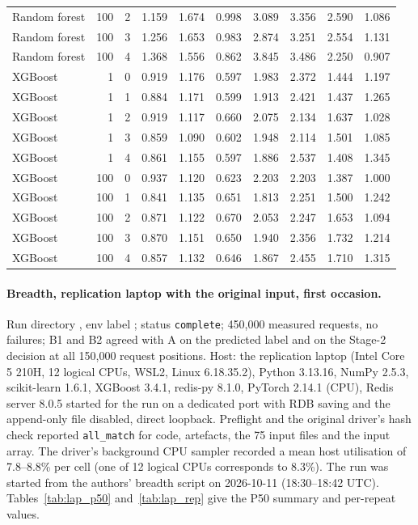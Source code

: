 \documentclass[10pt,a4paper]{article}
\begin{document}
\begin{longtable}{lrrrrrrrrr}
Random forest & 100 & 2 & 1.159 & 1.674 & 0.998 & 3.089 & 3.356 & 2.590 & 1.086 \\
Random forest & 100 & 3 & 1.256 & 1.653 & 0.983 & 2.874 & 3.251 & 2.554 & 1.131 \\
Random forest & 100 & 4 & 1.368 & 1.556 & 0.862 & 3.845 & 3.486 & 2.250 & 0.907 \\
XGBoost & 1 & 0 & 0.919 & 1.176 & 0.597 & 1.983 & 2.372 & 1.444 & 1.197 \\
XGBoost & 1 & 1 & 0.884 & 1.171 & 0.599 & 1.913 & 2.421 & 1.437 & 1.265 \\
XGBoost & 1 & 2 & 0.919 & 1.117 & 0.660 & 2.075 & 2.134 & 1.637 & 1.028 \\
XGBoost & 1 & 3 & 0.859 & 1.090 & 0.602 & 1.948 & 2.114 & 1.501 & 1.085 \\
XGBoost & 1 & 4 & 0.861 & 1.155 & 0.597 & 1.886 & 2.537 & 1.408 & 1.345 \\
XGBoost & 100 & 0 & 0.937 & 1.120 & 0.623 & 2.203 & 2.203 & 1.387 & 1.000 \\
XGBoost & 100 & 1 & 0.841 & 1.135 & 0.651 & 1.813 & 2.251 & 1.500 & 1.242 \\
XGBoost & 100 & 2 & 0.871 & 1.122 & 0.670 & 2.053 & 2.247 & 1.653 & 1.094 \\
XGBoost & 100 & 3 & 0.870 & 1.151 & 0.650 & 1.940 & 2.356 & 1.732 & 1.214 \\
XGBoost & 100 & 4 & 0.857 & 1.132 & 0.646 & 1.867 & 2.455 & 1.710 & 1.315 \\
\bottomrule
\end{longtable}

\paragraph{Breadth, replication laptop with the original input, first occasion.} Run directory , env label ; status \texttt{complete}; 450,000 measured requests, no failures; B1 and B2 agreed with A on the predicted label and on the Stage-2 decision at all 150,000 request positions. Host: the replication laptop (Intel Core 5 210H, 12 logical CPUs, WSL2, Linux 6.18.35.2), Python 3.13.16, NumPy 2.5.3, scikit-learn 1.6.1, XGBoost 3.4.1, redis-py 8.1.0, PyTorch 2.14.1 (CPU), Redis server 8.0.5 started for the run on a dedicated port with RDB saving and the append-only file disabled, direct loopback. Preflight and the original driver's hash check reported \texttt{all\_match} for code, artefacts, the 75 input files and the input array. The driver's background CPU sampler recorded a mean host utilisation of 7.8--8.8\% per cell (one of 12 logical CPUs corresponds to 8.3\%). The run was started from the authors' breadth script on 2026-10-11 (18:30--18:42 UTC). Tables~\ref{tab:lap_p50} and~\ref{tab:lap_rep} give the P50 summary and per-repeat values.
\end{document}
